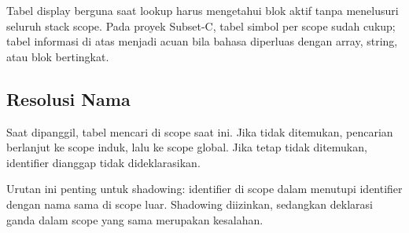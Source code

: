 Tabel display berguna saat lookup harus mengetahui blok aktif tanpa
menelusuri seluruh stack scope. Pada proyek Subset-C, tabel simbol
per scope sudah cukup; tabel informasi di atas menjadi acuan bila
bahasa diperluas dengan array, string, atau blok bertingkat.

\subsection{Resolusi Nama}

Saat  dipanggil, tabel mencari di scope saat ini. Jika
tidak ditemukan, pencarian berlanjut ke scope induk, lalu ke scope
global. Jika tetap tidak ditemukan, identifier dianggap tidak
dideklarasikan.

Urutan ini penting untuk shadowing: identifier di scope dalam
menutupi identifier dengan nama sama di scope luar. Shadowing
diizinkan, sedangkan deklarasi ganda dalam scope yang sama merupakan
kesalahan.
